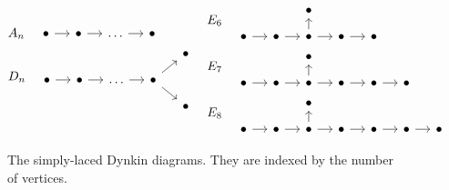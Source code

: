 \begin{figure}[ht]
	\centering
	\begin{align*}
		 &
		\begin{aligned}
			 & A_n \quad \begin{tikzcd}[ampersand replacement=\&, sep=small]
				             \bullet \rar \& \bullet \rar \&\dots \rar \&\bullet
			             \end{tikzcd}               \\
			 & D_n \quad \begin{tikzcd}[ampersand replacement=\&, sep=small]
				             \&\&\&\&\bullet \\
				             \bullet \rar \& \bullet \rar \&\dots \rar \& \bullet \drar \urar \\
				             \&\&\&\&\bullet
			             \end{tikzcd}
		\end{aligned}
		 &   &
		\begin{aligned}
			 & E_6 \quad \begin{tikzcd}[ampersand replacement=\&, sep=small]
				             \&\&\bullet\\
				             \bullet \rar \& \bullet \rar \&\bullet \rar\uar \& \bullet \rar \& \bullet
			             \end{tikzcd}                                \\
			 & E_7 \quad \begin{tikzcd}[ampersand replacement=\&, sep=small]
				             \&\&\bullet\\
				             \bullet \rar \& \bullet \rar \&\bullet \rar\uar \& \bullet \rar \& \bullet \rar \& \bullet
			             \end{tikzcd}                \\
			 & E_8 \quad \begin{tikzcd}[ampersand replacement=\&, sep=small]
				             \&\&\bullet\\
				             \bullet \rar \& \bullet \rar \&\bullet \rar\uar \& \bullet \rar \& \bullet \rar \& \bullet\rar \& \bullet
			             \end{tikzcd}
		\end{aligned}
	\end{align*}

	\caption{The simply-laced Dynkin diagrams. They are indexed by the number of vertices.}
	\label{fig:dynkin_diagrams_ade}
\end{figure}

